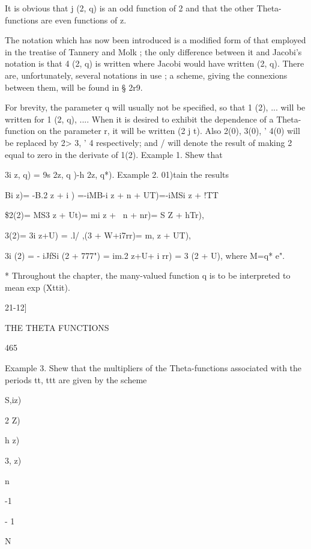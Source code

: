 It is obvious that  j (2, q) is an odd function of 2 and that the other 
Theta-functions are even functions of z. 

The notation which has now been introduced is a modified form of 
that employed in the treatise of Tannery and Molk ; the only difference 
between it and Jacobi's notation is that  4 (2, q) is written where Jacobi 
would have written   (2, q). There are, unfortunately, several notations in 
use ; a scheme, giving the connexions between them, will be found in § 2r9. 

For brevity, the parameter q will usually not be specified, so that  1 (2), ... 
will be written for  1 (2, q), .... When it is desired to exhibit the dependence 
of a Theta-function on the parameter r, it will be written   (2 j t). Also 
 2(0),  3(0), ' 4(0) will be replaced by  2>  3, ' 4 respectively; and  / will 
denote the result of making 2 equal to zero in the derivate of  1(2). 
Example 1. Shew that 

3i z, q) = 9s 2z, q )-h 2z, q*). 
Example 2. 01)tain the results 

Bi z)= -B.2 z + i ) =-iMB-i z +  n + UT)=-iMSi z +  !TT\ 

\$2(2)= MS3 z + Ut)= mi z +  \ n +  nr)= S Z + hTr), 

 3(2)= 3i z+U) = .l/ ,(3 + W+i7rr)= m, z + UT), 

3i (2) = - iJfSi (2 +  777") = im.2  z+U+ i rr) =  3 (2 + U), 
where M=q* e". 

* Throughout the chapter, the many-valued function q  is to be interpreted to mean 
exp (Xttit). 



21-12] 



THE THETA FUNCTIONS 



465 



Example 3. Shew that the multipliers of the Theta-functions associated with the 
periods tt, ttt are given by the scheme 





S,iz) 


 2 Z) 


h z) 


3, z) 


n 


-1 


- 1 

N 


